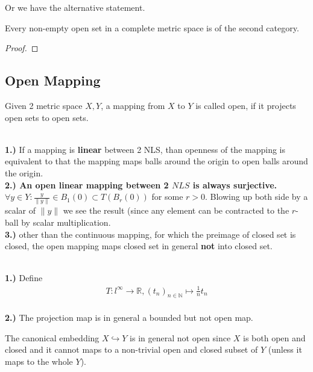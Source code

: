 Or we have the alternative statement.
\begin{corollary}
	Every non-empty open set in a complete metric space is of the second category.
\end{corollary}
\begin{proof}
\end{proof}




\subsection{Open Mapping}
\begin{definition}
	Given 2 metric space $X, Y$, a mapping from $X$ to $Y$ is called open, if it projects open sets to open sets.
\end{definition}
\begin{remark}
\quad\\
\textbf{1.) }If a mapping is \textbf{linear} between 2 NLS, than openness of the mapping is equivalent to that the mapping maps balls around the origin to open balls around the origin.\\
\textbf{2.) An open linear mapping between 2 $NLS$ is always surjective.} $\forall y \in Y: \frac{y}{\|y\|} \in B_1(0) \subset T(B_r(0))$ for some $r > 0$. Blowing up both side by a scalar of $\|y\|$ we see the result (since any element can be contracted to the $r$-ball by scalar multiplication.\\
\textbf{3.)} other than the continuous mapping, for which the preimage of closed set is closed, the open mapping maps closed set in general \textbf{not} into closed set.  
\end{remark}

\begin{example}
\quad\\
\textbf{1.) }Define
	\begin{align*}
		T: l^\infty \rightarrow \mathbb{R}, (t_n)_{n \in \mathbb{N}} \mapsto \frac{1}{n} t_n
	\end{align*}
\quad\\
\textbf{2.)}
	The projection map is in general a bounded but not open map.
\end{example}

\begin{example}
	The canonical embedding $X \hookrightarrow Y$ is in general not open since $X$ is both open and closed and it cannot maps to a non-trivial open and closed subset of $Y$ (unless it maps to the whole $Y$).  
\end{example}

